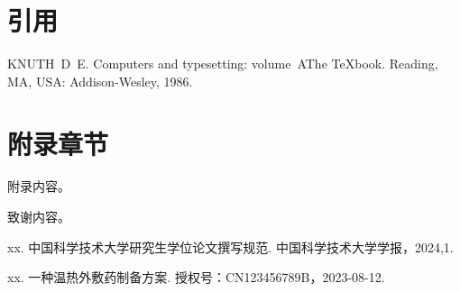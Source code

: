 \chapter{引用}
\cite{knuth86a}

\begin{thebibliography}{1}
KNUTH~D~E.
\newblock Computers and typesetting: volume~A\quad The
  {\TeX}book\allowbreak[M].
\newblock Reading, MA, USA: Addison-Wesley, 1986.
\end{thebibliography}

\appendix
\chapter{附录章节}
附录内容。

\backmatter
\begin{acknowledgements}
  致谢内容。
\end{acknowledgements}

\begin{achievements}

\begin{theachievements}[已发表论文]
  \item xx. 中国科学技术大学研究生学位论文撰写规范. 中国科学技术大学学报，2024,1.
\end{theachievements}

\begin{theachievements}[发明专利]
  \item xx. 一种温热外敷药制备方案. 授权号：CN123456789B，2023-08-12.
\end{theachievements}

\end{achievements}
